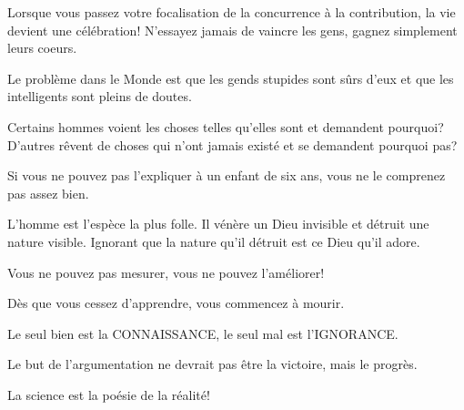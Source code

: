 \documentclass[12pt,a4paper,twoside,openright]{report}
\theoremstyle{definition}
\theoremstyle{itexmp}
\numberwithin{equation}{section}
\begin{document}
 	\begin{fquote}[Buddha]Lorsque vous passez votre focalisation de la concurrence à la contribution, la vie devient une célébration! N'essayez jamais de vaincre les gens, gagnez simplement leurs coeurs.
 	\end{fquote}
 	
 	\begin{fquote}Le problème dans le Monde est que les gends stupides sont sûrs d'eux et que les intelligents sont pleins de doutes.
 	\end{fquote}
 	
 	\begin{fquote}Certains hommes voient les choses telles qu'elles sont et demandent pourquoi? D'autres rêvent de choses qui n'ont jamais existé et se demandent pourquoi pas?
 	\end{fquote}
 	
 	\begin{fquote}Si vous ne pouvez pas l'expliquer à un enfant de six ans, vous ne le comprenez pas assez bien.
 	\end{fquote}
 	
 	\begin{fquote}L'homme est l'espèce la plus folle. Il vénère un Dieu invisible et détruit une nature visible. Ignorant que la nature qu'il détruit est ce Dieu qu'il adore.
 	\end{fquote}
 	
 	\begin{fquote}Vous ne pouvez pas mesurer, vous ne pouvez l'améliorer!
 	\end{fquote}
 	
 	\begin{fquote}Dès que vous cessez d'apprendre, vous commencez à mourir.
 	\end{fquote}
 	
 	\begin{fquote}[Socrates]Le seul bien est la CONNAISSANCE, le seul mal est l'IGNORANCE.
 	\end{fquote}
 	
 	\begin{fquote}[?]Le but de l'argumentation ne devrait pas être la victoire, mais le progrès.
 	\end{fquote}
 	
 	\begin{fquote}La science est la poésie de la réalité!
 	\end{fquote}
 	
\end{document}
